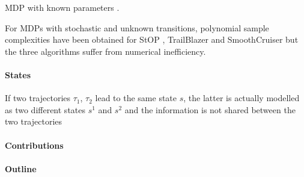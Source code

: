 \documentclass[runningheads]{llncs}
\begin{document}
MDP with known parameters \citep{busoniu2012optimistic}.

For MDPs with stochastic and unknown transitions, polynomial sample complexities have been obtained for StOP \citep{STOP14}, TrailBlazer \citep{TrailBlazer16} and SmoothCruiser \citep{SmoothCruiser19} but the three algorithms suffer from numerical inefficiency.

\paragraph{States}



If two trajectories $\tau_1$, $\tau_2$ lead to the same state $s$, the latter is actually modelled as two different states $s^1$ and $s^2$ and the information is not shared between the two trajectories

\paragraph{Contributions}

\paragraph{Outline}
\end{document}
